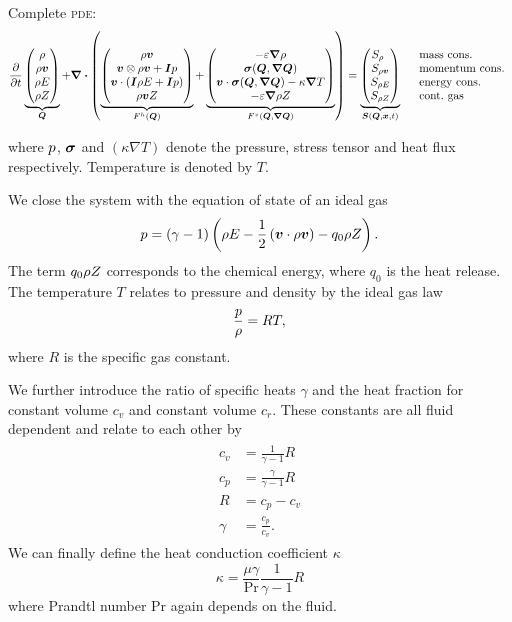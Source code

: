 Complete \textsc{pde}:
\begin{equation}
  \pdv{}{t}
  \underbrace{
  \begin{pmatrix}
    \Qrho\\
    \Qj\\
    \QE\\
    \QZ
    \end{pmatrix}}_{\Q}
  + 
  \divergence{
  \left(
   \underbrace{\hyperFluxDef}_{\hyperFlux(\Q)}
+
\underbrace{\viscFluxDef}_{\viscFlux(\Q, \gradQ)}
  \right)}
 =
  \underbrace{
  \begin{pmatrix}
    S_{\Qrho\phantom{\Qrho}}\\
    S_{\Qj}\\
    S_{\QE}\\
    S_{\QZ}
    \end{pmatrix}}_{\source(\Q, \bm{x}, t)}
\quad
 \begin{array}{l}
 \text{mass cons.} \\
 \text{momentum cons.} \\
 \text{energy cons.} \\
 \text{cont.\ gas} 
\end{array}
\end{equation}

where $p$, $\bm{\sigma}$ and $(\kappa \nabla T)$ denote the pressure, stress tensor and heat flux respectively.
Temperature is denoted by $T$.

We close the system with the equation of state of an ideal gas
\begin{equation}
  \label{eq:eos}
  p = (\gamma - 1) \left(\rho E - \frac{1}{2} \left(\bm{v} \cdot \rho \bm{v} \right)  - q_0 \rho Z \right).
\end{equation}
The term $q_0 \rho Z$ corresponds to the chemical energy, where $q_0$ is the heat release.
The temperature $T$ relates to pressure and density by the ideal gas law
\begin{equation}
  \label{eq:temperature}
 \frac{p}{\rho} = RT,
\end{equation}
where $R$ is the specific gas constant.

We further introduce the ratio of specific heats $\gamma$ and the heat fraction for constant volume $c_v$ and constant volume $c_r$.
These constants are all fluid dependent and relate to each other by
\begin{align}
  \label{eq:fluid-constants}
  \begin{split}
  c_v &= \frac{1}{\gamma - 1} R \\
  c_p &= \frac{\gamma}{\gamma - 1} R\\
  R &= c_p - c_v\\
  \gamma &= \frac{c_p}{c_v}.
  \end{split}
\end{align}
We can finally define the heat conduction coefficient $\kappa$
\begin{equation}
  \label{eq:heat-conduction-coeff}
  \kappa = \frac{\mu \gamma}{\Pr} \frac{1}{\gamma - 1} R
\end{equation}
where Prandtl number $\text{Pr}$ again depends on the fluid.

